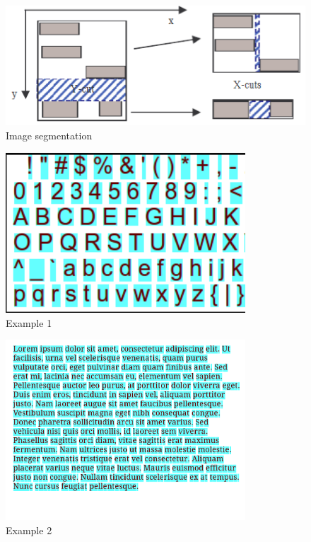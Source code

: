 \documentclass[12pt]{report}
\begin{document}
\begin{figure}[H]
    \centering
    \includegraphics[width=1\textwidth]{Image_segmentation}
    \caption{Image segmentation}
\end{figure}
\vspace{2em}
\begin{figure}[H]
    \centering
    \includegraphics[width=0.8\textwidth]{Seg_example_1}
    \caption{Example 1}
\end{figure}
\begin{figure}[H]
    \centering
    \includegraphics[width=0.8\textwidth]{Seg_example_2}
    \caption{Example 2}
\end{figure}
\end{document}
